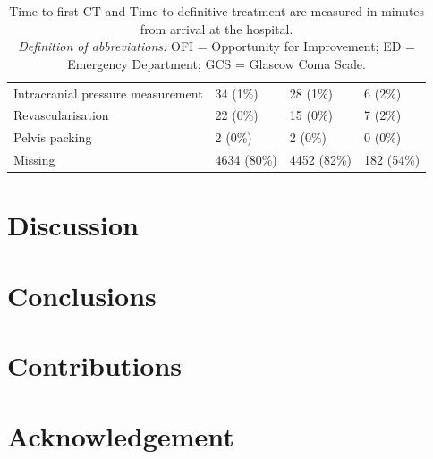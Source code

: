 \documentclass[12pt, letterpaper]{article}
\begin{document}
\begin{table}
{\begin{tabular}{llll}
            \hspace{3mm}Intracranial pressure measurement & 34 (1\%)         & 28 (1\%)        & 6 (2\%)       \\
            \hspace{3mm}Revascularisation                 & 22 (0\%)         & 15 (0\%)        & 7 (2\%)       \\
            \hspace{3mm}Pelvis packing                    & 2 (0\%)          & 2 (0\%)         & 0 (0\%)       \\
            \hspace{3mm}Missing                           & 4634 (80\%)      & 4452 (82\%)     & 182 (54\%)    \\
            \bottomrule
        \end{tabular}
    }
    \caption*{\scriptsize Time to first CT and Time to definitive treatment are measured in minutes from arrival at the hospital.\\
        \textit{Definition of abbreviations:} OFI = Opportunity for Improvement; ED = Emergency Department; GCS = Glascow Coma Scale.}
\end{table}

\section{Discussion}

\section{Conclusions}

\section*{Contributions}

\section*{Acknowledgement}

\newpage

\singlespacing

\printbibliography

\newpage
\end{document}
